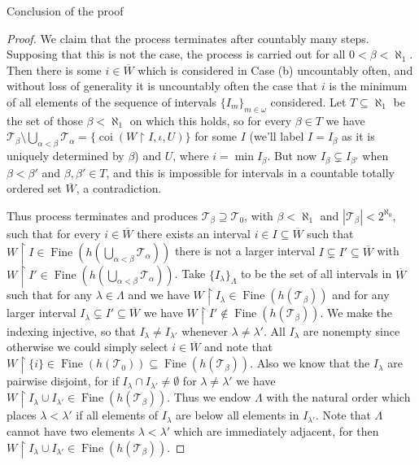 \documentclass{amsart}
\theoremstyle{definition}\newtheorem{theorem}{Theorem}
\theoremstyle{definition}\newtheorem*{A}{Main Theorem}
\theoremstyle{definition}\newtheorem*{B}{Theorem \ref{elementaryequiv}}
\theoremstyle{definition}\newtheorem*{C}{Theorem \ref{continuous}}
\theoremstyle{definition}\newtheorem*{D}{Theorem \ref{bigisomorphism2}}
\theoremstyle{definition}\newtheorem{bigtheorem}{Main Theorem}
\numberwithin{theorem}{section}
\theoremstyle{definition}\newtheorem{corollary}[theorem]{Corollary}
\theoremstyle{definition}\newtheorem{proposition}[theorem]{Proposition}
\theoremstyle{definition}\newtheorem{definition}[theorem]{Definition}
\theoremstyle{definition}\newtheorem{question}[theorem]{Question}
\theoremstyle{definition}\newtheorem{example}[theorem]{Example}
\theoremstyle{definition}\newtheorem{remark}[theorem]{Remark}
\theoremstyle{definition}\newtheorem{note}[theorem]{Note}
\theoremstyle{definition}\newtheorem{lemma}[theorem]{Lemma}
\theoremstyle{definition}\newtheorem{fact}[theorem]{Fact}
\theoremstyle{definition}\newtheorem{define}[theorem]{Definition}
\theoremstyle{definition}\newtheorem{claim}[theorem]{Claim}
\theoremstyle{definition}\newtheorem{obs}[theorem]{Observation}
\theoremstyle{definition}\newtheorem{definitions}[theorem]{Definitions}
\newcommand{\Fine}{\operatorname{Fine}}
\newcommand{\coi}{\operatorname{coi}}
\begin{document}
\begin{section}{Conclusion of the proof}
\begin{proof}
We claim that the process terminates after countably many steps.  Supposing that this is not the case, the process is carried out for all $0 < \beta < \aleph_1$.  Then there is some $i \in \overline{W}$ which is considered in Case (b) uncountably often, and without loss of generality it is uncountably often the case that $i$ is the minimum of all elements of the sequence of intervals $\{I_m\}_{m \in \omega}$ considered.  Let $T \subseteq \aleph_1$ be the set of those $\beta < \aleph_1$ on which this holds, so for every $\beta \in T$ we have $\mathcal{T}_{\beta} \setminus \bigcup_{\alpha < \beta} \mathcal{T}_{\alpha} = \{\coi(W \upharpoonright I, \iota, U)\}$ for some $I$ (we'll label $I = I_{\beta}$ as it is uniquely determined by $\beta$) and $U$, where $i = \min I_{\beta}$.  But now $I_{\beta} \subsetneq I_{\beta'}$ when $\beta < \beta'$ and $\beta, \beta' \in T$, and this is impossible for intervals in a countable totally ordered set $\overline{W}$, a contradiction.


Thus process terminates and produces $\mathcal{T}_{\beta} \supseteq \mathcal{T}_0$, with $\beta < \aleph_1$ and $|\mathcal{T}_{\beta}| < 2^{\aleph_0}$, such that for every $i \in \overline{W}$ there exists an interval $i \in I \subseteq \overline{W}$ such that $W \upharpoonright I \in \Fine(h(\bigcup_{\alpha < \beta} \mathcal{T}_{\alpha}))$ there is not a larger interval $I \subsetneq I' \subseteq \overline{W}$ with $W \upharpoonright I' \in \Fine(h(\bigcup_{\alpha < \beta} \mathcal{T}_{\alpha}))$.  Take $\{I_{\lambda}\}_{\Lambda}$ to be the set of all intervals in $\overline{W}$ such that for any $\lambda \in \Lambda$ and we have $W\upharpoonright I_{\lambda} \in \Fine(h(\mathcal{T}_{\beta}))$ and for any larger interval $I_{\lambda} \subsetneq I' \subseteq \overline{W}$ we have $W \upharpoonright I' \notin \Fine(h(\mathcal{T}_{\beta}))$.  We make the indexing injective, so that $I_{\lambda} \neq I_{\lambda'}$ whenever $\lambda \neq \lambda'$.  All $I_{\lambda}$ are nonempty since otherwise we could simply select $i \in \overline{W}$ and note that $W\upharpoonright \{i\} \in \Fine(h(\mathcal{T}_0)) \subseteq \Fine(h(\mathcal{T}_{\beta}))$.  Also we know that the $I_{\lambda}$ are pairwise disjoint, for if $I_{\lambda} \cap I_{\lambda'} \neq \emptyset$ for $\lambda \neq \lambda'$ we have $W \upharpoonright I_{\lambda} \cup I_{\lambda'} \in \Fine(h(\mathcal{T}_{\beta}))$.  Thus we endow $\Lambda$ with the natural order which places $\lambda < \lambda'$ if all elements of $I_{\lambda}$ are below all elements in $I_{\lambda'}$.  Note that $\Lambda$ cannot have two elements $\lambda < \lambda'$ which are immediately adjacent, for then $W \upharpoonright I_{\lambda} \cup I_{\lambda'} \in \Fine(h(\mathcal{T}_{\beta}))$.


\end{proof}
\end{section}
\end{document}
